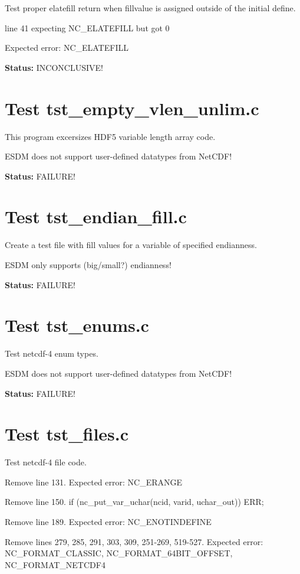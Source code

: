 Test proper elatefill return when fillvalue is assigned outside of
the initial define.

line 41 expecting NC\_ELATEFILL but got 0

Expected error: NC\_ELATEFILL

{\bf \large Status: } INCONCLUSIVE!

\section{Test tst\_empty\_vlen\_unlim.c}

This program excersizes HDF5 variable length array code.

ESDM does not support user-defined datatypes from NetCDF!

{\bf \large Status: } FAILURE!

\section{Test tst\_endian\_fill.c}

Create a test file with fill values for a variable of specified endianness.

ESDM only supports (big/small?) endianness!

{\bf \large Status: } FAILURE!

\section{Test tst\_enums.c}

Test netcdf-4 enum types.

ESDM does not support user-defined datatypes from NetCDF!

{\bf \large Status: } FAILURE!

\section{Test tst\_files.c}

Test netcdf-4 file code.

Remove line 131. Expected error: NC\_ERANGE

Remove line 150. if (nc\_put\_var\_uchar(ncid, varid, uchar\_out)) ERR;

Remove line 189. Expected error: NC\_ENOTINDEFINE

Remove lines 279, 285, 291, 303, 309, 251-269, 519-527. Expected error: NC\_FORMAT\_CLASSIC, NC\_FORMAT\_64BIT\_OFFSET, NC\_FORMAT\_NETCDF4

